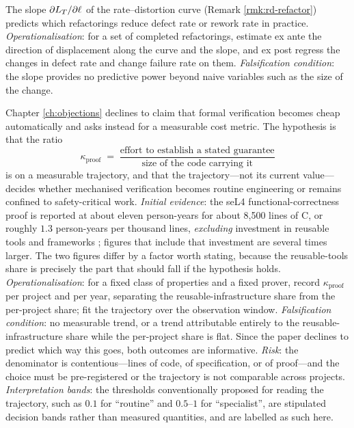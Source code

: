 \begin{hypothesis}\label{hyp:h12}
The slope $\partial L_T / \partial \ell$ of the rate--distortion curve (Remark
\ref{rmk:rd-refactor}) predicts which refactorings reduce defect rate or rework rate in
practice.
\emph{Operationalisation}: for a set of completed refactorings, estimate ex ante the
direction of displacement along the curve and the slope, and ex post regress the changes in
defect rate and change failure rate on them.
\emph{Falsification condition}: the slope provides no predictive power beyond naive
variables such as the size of the change.
\end{hypothesis}

\begin{hypothesis}\label{hyp:h13}
Chapter \ref{ch:objections} declines to claim that formal verification becomes cheap automatically
and asks instead for a measurable cost metric. The hypothesis is that the ratio
\[
\kappa_{\text{proof}} \;=\; \frac{\text{effort to establish a stated guarantee}}{\text{size of the code carrying it}}
\]
is on a measurable trajectory, and that the trajectory---not its current value---decides whether
mechanised verification becomes routine engineering or remains confined to safety-critical work.
\emph{Initial evidence}: the seL4 functional-correctness proof is reported at about eleven
person-years for about 8{,}500 lines of C, or roughly $1.3$ person-years per thousand lines,
\emph{excluding} investment in reusable tools and frameworks \cite{klein2009}; figures that include
that investment are several times larger. The two figures differ by a factor worth stating, because
the reusable-tools share is precisely the part that should fall if the hypothesis holds.
\emph{Operationalisation}: for a fixed class of properties and a fixed prover, record
$\kappa_{\text{proof}}$ per project and per year, separating the reusable-infrastructure share from
the per-project share; fit the trajectory over the observation window.
\emph{Falsification condition}: no measurable trend, or a trend attributable entirely to the
reusable-infrastructure share while the per-project share is flat. Since the paper declines to
predict which way this goes, both outcomes are informative.
\emph{Risk}: the denominator is contentious---lines of code, of specification, or of proof---and the
choice must be pre-registered or the trajectory is not comparable across projects.
\emph{Interpretation bands}: the thresholds conventionally proposed for reading the trajectory, such
as $0.1$ for ``routine'' and $0.5$--$1$ for ``specialist'', are stipulated decision bands rather
than measured quantities, and are labelled as such here.
\end{hypothesis}

